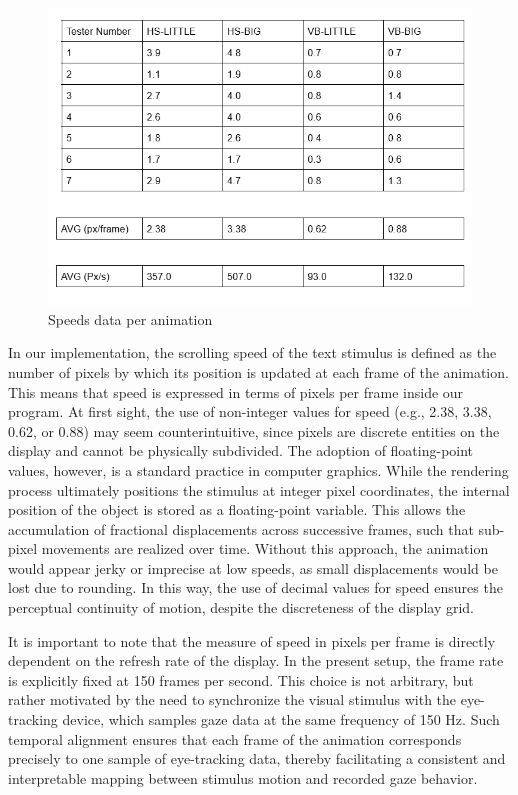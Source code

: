 \documentclass{article}
\begin{document}
\begin{figure}[ht]
    \centering
    \includegraphics[width = 0.6
    \textwidth]{Images/Experiment/speeds.png}
    \caption{Speeds data per animation}
    \label{fig:sped}
\end{figure}

In our implementation, the scrolling speed of the text stimulus is defined as the number of pixels by which its position is updated at each frame of the animation.
This means that speed is expressed in terms of pixels per frame inside our program. 
At first sight, the use of non-integer values for speed (e.g., 2.38, 3.38, 0.62, or 0.88) may seem counterintuitive, since pixels are discrete entities on the display and cannot be physically subdivided. 
The adoption of floating-point values, however, is a standard practice in computer graphics. 
While the rendering process ultimately positions the stimulus at integer pixel coordinates, the internal position of the object is stored as a floating-point variable. 
This allows the accumulation of fractional displacements across successive frames, such that sub-pixel movements are realized over time. 
Without this approach, the animation would appear jerky or imprecise at low speeds, as small displacements would be lost due to rounding. 
In this way, the use of decimal values for speed ensures the perceptual continuity of motion, despite the discreteness of the display grid.

It is important to note that the measure of speed in pixels per frame is directly dependent on the refresh rate of the display. 
In the present setup, the frame rate is explicitly fixed at 150 frames per second. 
This choice is not arbitrary, but rather motivated by the need to synchronize the visual stimulus with the eye-tracking device, which samples gaze data at the same frequency of 150 Hz. 
Such temporal alignment ensures that each frame of the animation corresponds precisely to one sample of eye-tracking data, thereby facilitating a consistent and interpretable mapping between stimulus motion and recorded gaze behavior.
\end{document}
